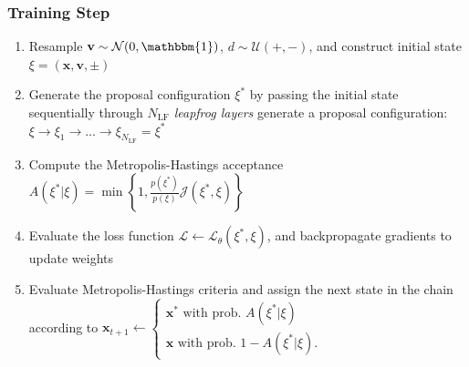 \documentclass[a4paper,11pt]{article}
\newcommand{\x}{\mathbf{x}}
\newcommand{\p}{\mathbf{v}}
\begin{document}
\subsubsection{\label{subsubsec:trainstep}Training Step}
%
\begin{enumerate}
    \item Resample \(\p \sim \mathcal{N} (0, \mathbbm{1})\),
        \(d \sim \mathcal{U} (+, -)\), and construct initial state
        \(\xi = (\x, \p, \pm)\)
    \item Generate the proposal configuration \(\xi^{\ast}\) by passing the
        initial state sequentially through \(N_{\mathrm{LF}}\) \emph{leapfrog
        layers }%
        generate a proposal configuration: \(\xi \rightarrow \xi_{1}
        \rightarrow \ldots \rightarrow \xi_{N_{\mathrm{LF}}} = \xi^{\ast}\)
    \item Compute the Metropolis-Hastings acceptance \(A(\xi^{\ast} | \xi) =
      \min\left\{1, \frac{p(\xi^{\ast})}{p(\xi)}
      \mathcal{J}(\xi^{\ast},\xi) \right\}\)
    \item Evaluate the loss function \(\mathcal{L} \leftarrow
        \mathcal{L}_{\theta}(\xi^{\ast}, \xi)\), and backpropagate gradients to
        update weights
    \item Evaluate Metropolis-Hastings criteria and assign the next state in
        the chain according to
        \(\x_{t+1} \leftarrow \begin{cases}%
            \x^{\ast} \text{ with prob. } A(\xi^{\ast}|\xi) \\
            \x \text{ with prob. } 1 - A(\xi^{\ast}|\xi).
        \end{cases}\)
\end{enumerate}
%
\end{document}
